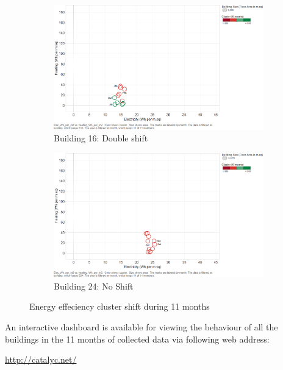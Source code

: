 \begin{figure}[H]
        \begin{subfigure}[b]{0.45\textwidth}
                \includegraphics[width=\textwidth]{images/b16_kmeans_allmonths.png}
                \caption{Building 16: Double shift}
                \label{fig:dbl}
        \end{subfigure}
        \begin{subfigure}[b]{0.45\textwidth}
                        \includegraphics[width=\textwidth]{images/b24_kmeans_allmonths.png}
                        \caption{Building 24: No Shift}
                        \label{fig:single}
       \end{subfigure}
     \caption{Energy effeciency cluster shift during 11 months}\label{fig:clustershift}
\end{figure}

An interactive dashboard is available for viewing the behaviour of all the buildings in the 11 months of collected data via following web address:

\begin{center}
\url{http://catalyc.net/}\end{center}

